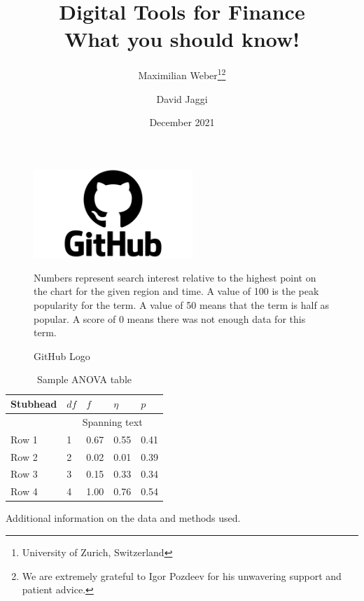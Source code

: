 \documentclass[10pt,a4paper]{article}
\title{%
  Digital Tools for Finance \\
  \large What you should know!}
\author{Maximilian Weber\thanks{University of Zurich, Switzerland}\;\thanks{We are extremely grateful to Igor Pozdeev for his unwavering support and patient advice.} \\
\and David Jaggi\footnotemark[1]\;\footnotemark[2]}
\date{December 2021}
\begin{document}
\maketitle
\begin{abstract}
    \blindtext
\end{abstract}
\newpage
\blindtext[3]
\textcite{gormsenCoronavirusImpactStock2020}
\begin{figure}[h!]%
    \centering
    \includegraphics[width=6cm]{text/paper/github_logo.png}%
    \caption{GitHub Logo}%
    \footnotesize Numbers represent search interest relative to the highest point on the chart for the given region and time. A value of 100 is the peak popularity for the term. A value of 50 means that the term is half as popular. A score of 0 means there was not enough data for this term.
    \label{fig:github_logo}%
\end{figure}
\blindtext[3]
\textcite{kozlowskiTailThatWags2020}
\begin{table}
    \centering  
  \begin{threeparttable}
    \caption{Sample ANOVA table}
     \begin{tabular}{lllll}
        \toprule
        Stubhead & \( df \) & \( f \) & \( \eta \) & \( p \) \\
        \midrule
                 &     \multicolumn{4}{c}{Spanning text}     \\
        Row 1    & 1        & 0.67    & 0.55       & 0.41    \\
        Row 2    & 2        & 0.02    & 0.01       & 0.39    \\
        Row 3    & 3        & 0.15    & 0.33       & 0.34    \\
        Row 4    & 4        & 1.00    & 0.76       & 0.54    \\
        \bottomrule
     \end{tabular}
    \begin{tablenotes}
      \small
      \item Additional information on the data and methods used.
    \end{tablenotes}
  \end{threeparttable}
\end{table}
\end{document}
